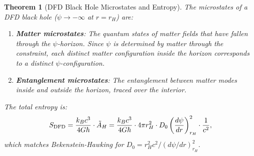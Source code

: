 \documentclass[11pt,a4paper]{article}
\newtheorem{theorem}{Theorem}
\begin{document}
\begin{theorem}[DFD Black Hole Microstates and Entropy]
\label{thm:BH-microstates}
The microstates of a DFD black hole ($\psi \to -\infty$ at $r = r_H$) are:
\begin{enumerate}
\item \textbf{Matter microstates}: The quantum states of matter fields that have fallen through the $\psi$-horizon. Since $\psi$ is determined by matter through the constraint, each distinct matter configuration inside the horizon corresponds to a distinct $\psi$-configuration.
\item \textbf{Entanglement microstates}: The entanglement between matter modes inside and outside the horizon, traced over the interior.
\end{enumerate}

The total entropy is:
\begin{equation}\label{eq:S-DFD-BH}
S_{\rm DFD} = \frac{k_B c^3}{4G\hbar}\cdot\tilde{A}_H = \frac{k_B c^3}{4G\hbar}\cdot 4\pi r_H^2\cdot D_0\left(\frac{d\psi}{dr}\right)^2_{r_H}\cdot\frac{1}{c^2},
\end{equation}
which matches Bekenstein-Hawking for $D_0 = r_H^2 c^2/(d\psi/dr)^2_{r_H}$.
\end{theorem}
\end{document}
